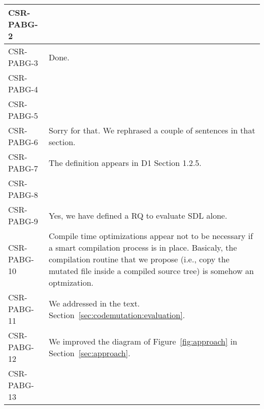 \begin{longtable}{|p{1.5cm}|p{12cm}|@{}}
CSR-PABG-2&
\begin{minipage}{12cm}
\TODO{}
\end{minipage}\\
\hline
CSR-PABG-3&
\begin{minipage}{12cm}
Done.
\end{minipage}\\
\hline
CSR-PABG-4&
\begin{minipage}{12cm}
\TODO{}
\end{minipage}\\
\hline
CSR-PABG-5&
\begin{minipage}{12cm}
\TODO{}
\end{minipage}\\
\hline
CSR-PABG-6&
\begin{minipage}{12cm}
Sorry for that. We rephrased a couple of sentences in that section.
\end{minipage}\\
\hline
CSR-PABG-7&
\begin{minipage}{12cm}
The definition appears in D1 Section 1.2.5.
\end{minipage}\\
\hline
CSR-PABG-8&
\begin{minipage}{12cm}
\end{minipage}\\
\hline
CSR-PABG-9&
\begin{minipage}{12cm}
Yes, we have defined a RQ to evaluate SDL alone.
\end{minipage}\\
\hline
CSR-PABG-10&
\begin{minipage}{12cm}
Compile time optimizations appear not to be necessary if a smart compilation process is in place. Basicaly, the compilation routine that we propose (i.e., copy the mutated file inside a compiled source tree) is somehow an optmization.
\end{minipage}\\
\hline
CSR-PABG-11&
\begin{minipage}{12cm}
We addressed in the text. Section~\ref{sec:codemutation:evaluation}.
\end{minipage}\\
\hline
CSR-PABG-12&
\begin{minipage}{12cm}
We improved the diagram of Figure~\ref{fig:approach} in Section~\ref{sec:approach}.
\end{minipage}\\
\hline
CSR-PABG-13&
\begin{minipage}{12cm}

\end{minipage}
\end{longtable}
